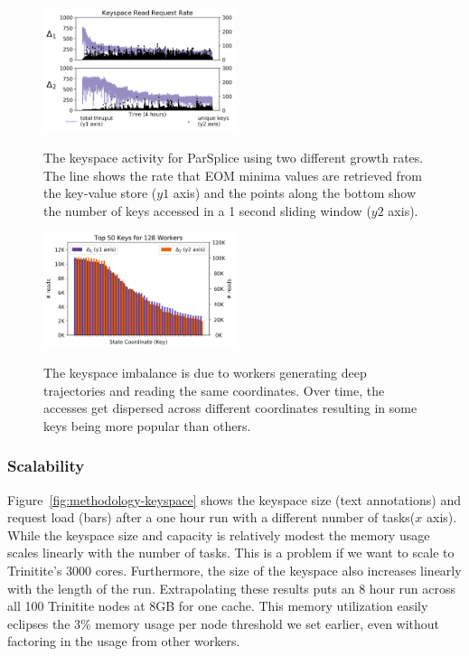 \begin{figure}[t]
  \noindent\includegraphics[width=0.5\textwidth]{figures/motivation-regimes.png}\\
  \caption{The keyspace activity for ParSplice using two different growth
rates.  The line shows the rate that EOM minima values are retrieved from the
key-value store (\(y1\) axis) and the points along the bottom show the number
of keys accessed in a 1 second sliding window (\(y2\) axis).
\label{fig:motivation-regimes}}
\end{figure}

\begin{figure}[t]
  \noindent\includegraphics[width=0.5\textwidth]{figures/methodology-keys.png}\\
  \caption{The keyspace imbalance is due to workers generating deep
  trajectories and reading the same coordinates. Over time, the accesses get
  dispersed across different coordinates resulting in some keys being more
  popular than others.\label{fig:methodology-keys}}
\end{figure}

\subsubsection*{Scalability} Figure~\ref{fig:methodology-keyspace} shows the
keyspace size (text annotations) and request load (bars) after a one hour run
with a different number of tasks(\(x\) axis). While the keyspace size and
capacity is relatively modest the memory usage scales linearly with the number
of tasks. This is a problem if we want to scale to Trinitite's 3000 cores.
Furthermore, the size of the keyspace also increases linearly with the length
of the run.  Extrapolating these results puts an 8 hour run across all 100
Trinitite nodes at 8GB for one cache.  This memory utilization easily eclipses
the 3\% memory usage per node threshold we set earlier, even without factoring
in the usage from other workers.

